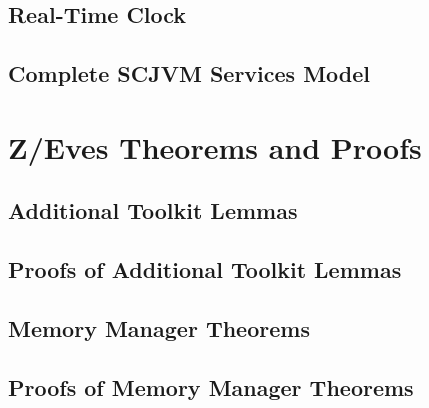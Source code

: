 \documentclass[a4paper,10pt]{report}
\begin{document}
\section{Real-Time Clock}


\section{Complete SCJVM Services Model}


\chapter{Z/Eves Theorems and Proofs}
\label{zeves-proofs}

\section{Additional Toolkit Lemmas}
\label{additional-lemmas}
\normalsize


\section{Proofs of Additional Toolkit Lemmas}
\label{additional-lemmas-proofs}
\scriptsize




\section{Memory Manager Theorems}
\label{memory-manager-theorems}
\normalsize


\section{Proofs of Memory Manager Theorems}
\label{memory-manager-proofs}
\scriptsize

\end{document}
